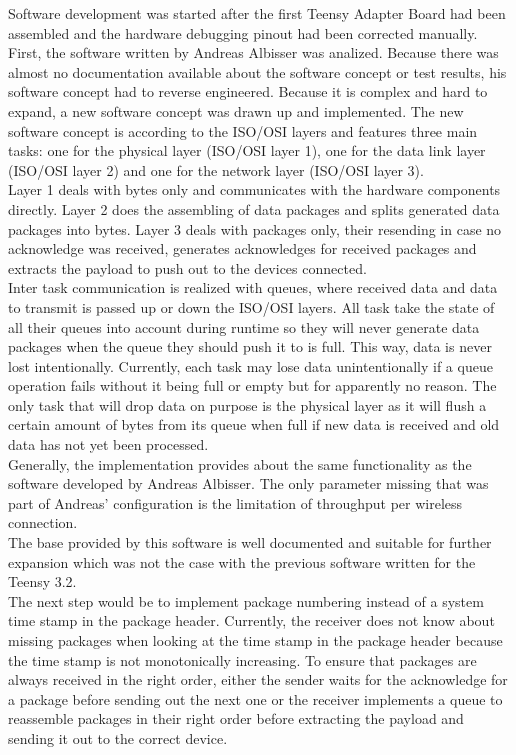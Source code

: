 Software development was started after the first Teensy Adapter Board had been assembled and the hardware debugging pinout had been corrected manually. First, the software written by Andreas Albisser was analized. Because there was almost no documentation available about the software concept or test results, his software concept had to reverse engineered. Because it is complex and hard to expand, a new software concept was drawn up and implemented. The new software concept is according to the ISO/OSI layers and features three main tasks: one for the physical layer (ISO/OSI layer 1), one for the data link layer (ISO/OSI layer 2) and one for the network layer (ISO/OSI layer 3).\\
Layer 1 deals with bytes only and communicates with the hardware components directly. Layer 2 does the assembling of data packages and splits generated data packages into bytes. Layer 3 deals with packages only, their resending in case no acknowledge was received, generates acknowledges for received packages and extracts the payload to push out to the devices connected.\\
Inter task communication is realized with queues, where received data and data to transmit is passed up or down the ISO/OSI layers. All task take the state of all their queues into account during runtime so they will never generate data packages when the queue they should push it to is full. This way, data is never lost intentionally. Currently, each task may lose data unintentionally if a queue operation fails without it being full or empty but for apparently no reason. The only task that will drop data on purpose is the physical layer as it will flush a certain amount of bytes from its queue when full if new data is received and old data has not yet been processed.\\
Generally, the implementation provides about the same functionality as the software developed by Andreas Albisser. The only parameter missing that was part of Andreas' configuration is the limitation of throughput per wireless connection.\\
The base provided by this software is well documented and suitable for further expansion which was not the case with the previous software written for the Teensy 3.2.\\
The next step would be to implement package numbering instead of a system time stamp in the package header. Currently, the receiver does not know about missing packages when looking at the time stamp in the package header because the time stamp is not monotonically increasing. To ensure that packages are always received in the right order, either the sender waits for the acknowledge for a package before sending out the next one or the receiver implements a queue to reassemble packages in their right order before extracting the payload and sending it out to the correct device.\\
